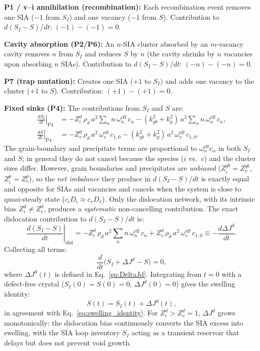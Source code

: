 \documentclass[pdflatex,sn-basic]{sn-jnl} %
\begin{document}
\textbf{P1 / v--i annihilation (recombination):}
Each recombination event removes one SIA ($-1$ from $S_I$) and one
vacancy ($-1$ from $S$). Contribution to $d(S_I - S)/dt$:
$(-1) - (-1) = 0$. \checkmark

\textbf{Cavity absorption (P2/P6):}
An $n$-SIA cluster absorbed by an $m$-vacancy cavity removes $n$ from
$S_I$ and reduces $S$ by $n$ (the cavity shrinks by $n$ vacancies upon
absorbing $n$ SIAs). Contribution to $d(S_I - S)/dt$: $(-n) - (-n) = 0$.
\checkmark

\textbf{P7 (trap mutation):}
Creates one SIA ($+1$ to $S_I$) and adds one vacancy to the cluster
($+1$ to $S$). Contribution: $(+1)-(+1) = 0$. \checkmark

\textbf{Fixed sinks (P4):}
The contributions from $S_I$ and $S$ are:
\begin{align}
    \left.\frac{dS_I}{dt}\right|_{\mathrm{P4}}
    &= -Z_i^d\,\rho_d\,a^2\sum_n n\,\omega_n^{\mathrm{eff}}\,c_n
       - (k_{gb}^2 + k_p^2)\,a^2\sum_n n\,\omega_n^{\mathrm{eff}}\,c_n,
    \label{eq:P4_SI_final}\\[4pt]
    \left.\frac{dS}{dt}\right|_{\mathrm{P4}}
    &= -Z_v^d\,\rho_d\,a^2\,\omega_v^{\mathrm{eff}}\,c_{1,0}
       - (k_{gb}^2 + k_p^2)\,a^2\,\omega_v^{\mathrm{eff}}\,c_{1,0}.
    \label{eq:P4_SV_final}
\end{align}
The grain-boundary and precipitate terms are proportional to
$\omega_\alpha^{\mathrm{eff}} c_\alpha$ in both $S_I$ and $S$; in general
they do not cancel because the species ($i$ vs.\ $v$) and the cluster sizes
differ. However, grain boundaries and precipitates are \emph{unbiased}
($Z_i^{gb} = Z_v^{gb}$, $Z_i^p = Z_v^p$), so the \emph{net imbalance}
they produce in $d(S_I - S)/dt$ is exactly equal and opposite for SIAs and
vacancies and cancels when the system is close to quasi-steady state
($c_i D_i \approx c_v D_v$). Only the dislocation network, with its
intrinsic bias $Z_i^d \neq Z_v^d$, produces a \emph{systematic}
non-cancelling contribution. The exact dislocation contribution to
$d(S_I - S)/dt$ is:
\begin{equation}\label{eq:P4_Q}
    \left.\frac{d(S_I - S)}{dt}\right|_{\mathrm{disl}}
    = -Z_i^d\,\rho_d\,a^2\sum_n n\,\omega_n^{\mathrm{eff}}\,c_n
    + Z_v^d\,\rho_d\,a^2\,\omega_v^{\mathrm{eff}}\,c_{1,0}
    \equiv -\frac{d\Delta J^d}{dt}.
\end{equation}
Collecting all terms:
\begin{equation}\label{eq:dQdt_exact}
\boxed{
    \frac{d}{dt}\bigl(S_I + \Delta J^d - S\bigr) = 0,
}
\end{equation}
where $\Delta J^d(t)$ is defined in Eq.~\eqref{eq:DeltaJd}. Integrating
from $t=0$ with a defect-free crystal ($S_I(0) = S(0) = 0$,
$\Delta J^d(0) = 0$) gives the swelling identity:
\begin{equation}\label{eq:swelling_id_app}
    S(t) = S_I(t) + \Delta J^d(t),
\end{equation}
in agreement with Eq.~\eqref{eq:swelling_identity}. For $Z_i^d > Z_v^d = 1$,
$\Delta J^d$ grows monotonically: the dislocation bias continuously converts
the SIA excess into swelling, with the SIA loop inventory $S_I$ acting as a
transient reservoir that delays but does not prevent void growth.
\end{document}
